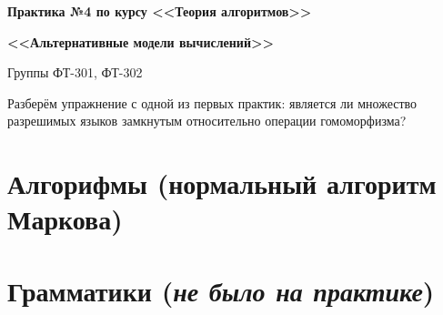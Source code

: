 \documentclass[
    11pt,
    a4paper
]{article}
\theoremstyle{definition}
\begin{document}
\centerline{\Large \bf Практика №4 по курсу <<Теория алгоритмов>>}
\centerline{\Large \bf <<Альтернативные модели вычислений>>}
\centerline{Группы ФТ-301, ФТ-302}

Разберём упражнение с одной из первых практик: является ли множество разрешимых языков замкнутым относительно операции гомоморфизма?


\section{Алгорифмы (нормальный алгоритм Маркова)}

\section{Грамматики (\textit{не было на практике})}
\end{document}
